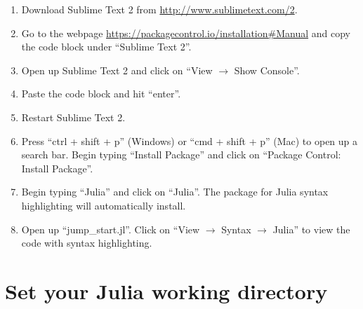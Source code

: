 \documentclass[12pt]{article}
\begin{document}
\begin{enumerate}

\item Download Sublime Text 2 from \url{http://www.sublimetext.com/2}.  

\item Go to the webpage \url{https://packagecontrol.io/installation\#Manual} and copy the code block under ``Sublime Text 2''.

\item Open up Sublime Text 2 and click on ``View $\rightarrow$ Show Console''.

\item Paste the code block and hit ``enter''.

\item Restart Sublime Text 2.  

\item Press ``ctrl + shift + p'' (Windows) or ``cmd + shift + p'' (Mac) to open up a search bar.  Begin typing ``Install Package'' and click on ``Package Control: Install Package''.  

\item Begin typing ``Julia'' and click on ``Julia''.  The package for Julia syntax highlighting will automatically install.  

\item Open up ``jump\_start.jl''.  Click on ``View $\rightarrow$ Syntax $\rightarrow$ Julia'' to view the code with syntax highlighting.  


\end{enumerate}

\section{Set your Julia working directory}
\end{document}
